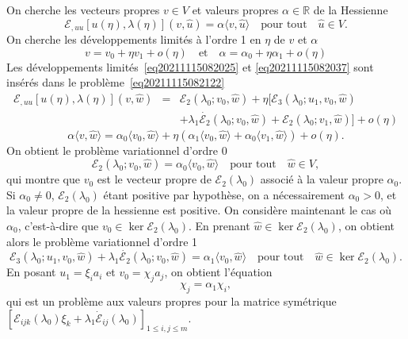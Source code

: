 \documentclass[12pt, final]{amsart}
\begin{document}
On cherche les vecteurs propres $v \in V$ et valeurs propres $\alpha \in
\mathbb{R}$ de la Hessienne
\begin{equation}
  \label{eq20211115082122} \mathcal{E}_{, u  u} [u (\eta), \lambda
  (\eta)] (v, \hat{u}) = \alpha \langle v, \hat{u} \rangle \quad \text{pour
  tout} \quad \hat{u} \in V.
\end{equation}
On cherche les développements limités {\`a} l'ordre 1 en $\eta$ de $v$
et $\alpha$
\begin{equation}
  \label{eq20211115082037} v = v_0 + \eta v_1 + o (\eta) \quad \text{et} \quad
  \alpha = \alpha_0 + \eta \alpha_1 + o (\eta)
\end{equation}
Les développements limités~\eqref{eq20211115082025} et
\eqref{eq20211115082037} sont insérés dans le
probl{\`e}me~\eqref{eq20211115082122}
\begin{eqnarray}
  \mathcal{E}_{, u  u} [u (\eta), \lambda (\eta)] (v, \hat{w}) & = &
  \mathcal{E}_2  (\lambda_0 ; v_0, \hat{w}) + \eta [\mathcal{E}_3  (\lambda_0
  ; u_1, v_0, \hat{w})  \nonumber\\
  &  &  + \lambda_1  \dot{\mathcal{E}_2} (\lambda_0 ; v_0, \hat{w})
   +\mathcal{E}_2  (\lambda_0 ; v_1, \hat{w})] + o (\eta)
\end{eqnarray}
\begin{equation}
  \alpha \langle v, \hat{w} \rangle = \alpha_0  \langle v_0, \hat{w} \rangle +
  \eta (\alpha_1 \langle v_0, \hat{w} \rangle + \alpha_0 \langle v_1, \hat{w}
  \rangle) + o (\eta) .
\end{equation}
On obtient le probl{\`e}me variationnel d'ordre 0
\begin{equation}
  \mathcal{E}_2 (\lambda_0 ; v_0, \hat{w}) = \alpha_0  \langle v_0, \hat{w}
  \rangle \quad \text{pour tout} \quad \hat{w} \in V,
\end{equation}
qui montre que $v_0$ est le vecteur propre de $\mathcal{E}_2  (\lambda_0)$
associé {\`a} la valeur propre $\alpha_0$. Si $\alpha_0 \neq 0$,
$\mathcal{E}_2  (\lambda_0)$ étant positive par hypoth{\`e}se, on a
nécessairement $\alpha_0 > 0$, et la valeur propre de la hessienne est
positive. On consid{\`e}re maintenant le cas o{\`u} $\alpha_0$,
c'est-{\`a}-dire que $v_0 \in \ker \mathcal{E}_2  (\lambda_0)$. En prenant
$\hat{w} \in \ker \mathcal{E}_2 (\lambda_0)$, on obtient alors le probl{\`e}me
variationnel d'ordre 1
\begin{equation}
  \mathcal{E}_3 (\lambda_0 ; u_1, v_0, \hat{w}) + \lambda_1
  \dot{\mathcal{E}_2} (\lambda_0 ; v_0, \hat{w}) = \alpha_1  \langle v_0,
  \hat{w} \rangle \quad \text{pour tout} \quad \hat{w} \in \ker \mathcal{E}_2
  (\lambda_0) .
\end{equation}
En posant $u_1 = \xi_i a_i$ et $v_0 = \chi_j a_j$, on obtient l'équation
\begin{equation}
  [\mathcal{E}_{i  j  k}  (\lambda_0) \xi_k + \lambda_1
  \dot{\mathcal{E}}_{i  j} (\lambda_0)] \chi_j = \alpha_1 \chi_i,
\end{equation}
qui est un probl{\`e}me aux valeurs propres pour la matrice symétrique
$[\mathcal{E}_{i  j  k}  (\lambda_0) \xi_k + \lambda_1
\dot{\mathcal{E}}_{i  j} (\lambda_0)]_{1 \leq i, j \leq m}$.

\end{document}
